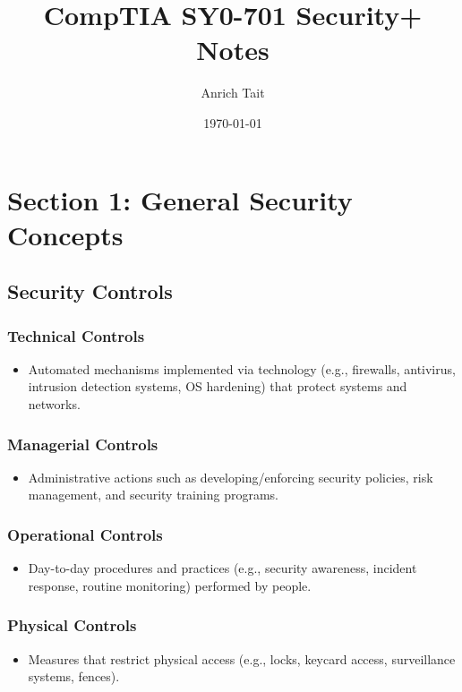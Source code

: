 \documentclass[11pt]{article}
\author{Anrich Tait}
\date{\today}
\title{CompTIA SY0-701 Security+ Notes}
\begin{document}
\maketitle
\tableofcontents

\section{Section 1: General Security Concepts}
\label{sec:org04851a1}
\subsection{Security Controls}
\label{sec:org701abf7}
\subsubsection{Technical Controls}
\label{sec:orgfa4debc}
\begin{itemize}
\item Automated mechanisms implemented via technology (e.g., firewalls, antivirus, intrusion detection systems, OS hardening) that protect systems and networks.
\end{itemize}
\subsubsection{Managerial Controls}
\label{sec:org929889d}
\begin{itemize}
\item Administrative actions such as developing/enforcing security policies, risk management, and security training programs.
\end{itemize}
\subsubsection{Operational Controls}
\label{sec:org8249272}
\begin{itemize}
\item Day-to-day procedures and practices (e.g., security awareness, incident response, routine monitoring) performed by people.
\end{itemize}
\subsubsection{Physical Controls}
\label{sec:orgd41681f}
\begin{itemize}
\item Measures that restrict physical access (e.g., locks, keycard access, surveillance systems, fences).
\end{itemize}
\end{document}
